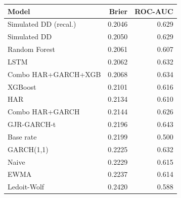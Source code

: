 \begin{tabular}{lrr}
\hline
Model & Brier & ROC-AUC \\
\hline
Simulated DD (recal.) & 0.2046 & 0.629 \\
Simulated DD & 0.2050 & 0.629 \\
Random Forest & 0.2061 & 0.607 \\
LSTM & 0.2062 & 0.632 \\
Combo HAR+GARCH+XGB & 0.2068 & 0.634 \\
XGBoost & 0.2101 & 0.616 \\
HAR & 0.2134 & 0.610 \\
Combo HAR+GARCH & 0.2144 & 0.626 \\
GJR-GARCH-t & 0.2196 & 0.643 \\
Base rate & 0.2199 & 0.500 \\
GARCH(1,1) & 0.2225 & 0.632 \\
Naive & 0.2229 & 0.615 \\
EWMA & 0.2237 & 0.614 \\
Ledoit-Wolf & 0.2420 & 0.588 \\
\hline
\end{tabular}
